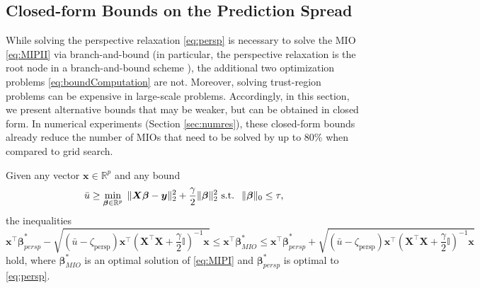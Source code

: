\documentclass[ijoc,noblindrev]{informs3} %
\newcommand{\ag}[1]{{\color{black}#1}}
\begin{document}

\subsection{Closed-form Bounds on the Prediction Spread}
\ag{While solving the perspective relaxation \eqref{eq:persp} is necessary to solve the MIO \eqref{eq:MIPII} via branch-and-bound (in particular, the perspective relaxation is the root node in a branch-and-bound scheme \citep{mazumder2023subset}), the additional two optimization problems \eqref{eq:boundComputation} are not. Moreover, solving trust-region problems can be expensive in large-scale problems. Accordingly, in this section, we present alternative bounds that may be weaker, but can be obtained in closed form. In numerical experiments (Section \ref{sec:numres}), these closed-form bounds already reduce the number of MIOs that need to be solved by up to 
80\% when compared to grid search.}

\begin{theorem}\label{prop:l10UB}
	Given any vector $\bm{x}\in \mathbb{R}^p$ and any bound
	\begin{equation}\label{eq:MIPI}
			\bar u\geq \min_{\bm{\beta}\in \mathbb{R}^p}\; \|\bm{X}\bm{\beta}-\bm{y}\|_2^2+\frac{\gamma}{2}\|\bm{\beta}\|_2^2
			\text{\rm\ s.t. }\; \|\bm{\beta}\|_0\leq \tau,
	\end{equation} 
	the inequalities
	\small
	$$\bm{x^\top\beta}_{persp}^*-\sqrt{\left(\bar u-\zeta_{\text{persp}}\right)\bm{x^\top}\left(\bm{X^\top X}+\frac{\gamma}{2}\mathbb{I}\right)^{-1}\bm{x}}\leq \bm{x}^\top \bm{\beta}_{MIO}^*\leq  \bm{x^\top\beta}_{persp}^*+\sqrt{\left(\bar u-\zeta_{\text{persp}}\right)\bm{x^\top}\left(\bm{X^\top X}+\frac{\gamma}{2}\mathbb{I}\right)^{-1}\bm{x}}$$\normalsize
	hold, where $\bm{\beta}_{MIO}^*$ is an optimal solution of \eqref{eq:MIPI} and $\bm{\beta}_{persp}^*$ is optimal to \eqref{eq:persp}.
\end{theorem}
\end{document}
